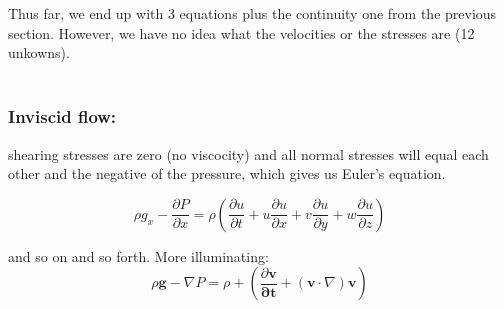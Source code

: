 \documentclass[10pt,a4paper,draft]{article}
\begin{document}
Thus far, we end up with 3 equations plus the continuity one from the previous section.
However, we have no idea what the velocities or the stresses are (12 unkowns). 
\\~\\

\subsubsection{Inviscid flow:} 
shearing stresses are zero (no viscocity) and all normal stresses will equal each other and the negative of the pressure, which gives us Euler's equation. 

$$
\rho g_x - \frac{\partial P}{\partial x} 
= \rho
\left(
	\frac{\partial u}{\partial t} 
+ u \frac{\partial u}{\partial x}
+ v \frac{\partial u}{\partial y}
+ w \frac{\partial u}{\partial z}
\right)
$$

and so on and so forth.
More illuminating: 
$$
\rho \mathbf{g} - \nabla P 
= \rho + \left( 
	\frac{\partial \mathbf{v}}{\mathbf{\partial t}}
	+ \left(\mathbf{v} \cdot \nabla \right) \mathbf{v}
\right) 
$$
\end{document}
